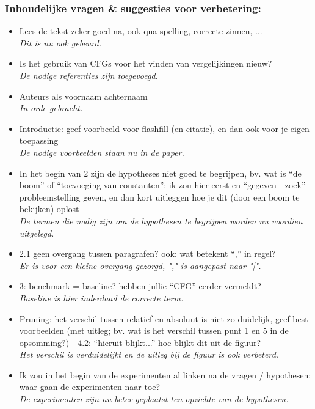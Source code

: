 \documentclass{article}
\begin{document}
\subsubsection{Inhoudelijke vragen \& suggesties voor verbetering:}
\begin{itemize}
\item Lees de tekst zeker goed na, ook qua spelling, correcte zinnen, ...
\\	\textit{Dit is nu ook gebeurd.}
\item Is het gebruik van CFGs voor het vinden van vergelijkingen nieuw?
\\	\textit{De nodige referenties zijn toegevoegd.}
\item Auteurs als voornaam achternaam
\\	\textit{In orde gebracht.}
\item Introductie: geef voorbeeld voor flashfill (en citatie), en dan ook voor je eigen toepassing
\\	\textit{De nodige voorbeelden staan nu in de paper.}
\item In het begin van 2 zijn de hypotheses niet goed te begrijpen, bv. wat is “de boom” of “toevoeging van constanten”; ik zou hier eerst en “gegeven - zoek” probleemstelling geven, en dan kort uitleggen hoe je dit (door een boom te bekijken) oplost
\\	\textit{De termen die nodig zijn om de hypothesen te begrijpen worden nu voordien uitgelegd.}
\item 2.1 geen overgang tussen paragrafen? ook: wat betekent “,” in regel?
\\	\textit{Er is voor een kleine overgang gezorgd, "," is aangepast naar "|".}
\item 3: benchmark = baseline? hebben jullie “CFG” eerder vermeldt?
\\	\textit{Baseline is hier inderdaad de correcte term.}
\item Pruning: het verschil tussen relatief en absoluut is niet zo duidelijk, geef best voorbeelden (met uitleg; bv. wat is het verschil tussen punt 1 en 5 in de opsomming?) - 4.2: “hieruit blijkt...” hoe blijkt dit uit de figuur?
\\	\textit{Het verschil is verduidelijkt en de uitleg bij de figuur is ook verbeterd.}
\item Ik zou in het begin van de experimenten al linken na de vragen / hypothesen; waar gaan de experimenten naar toe?
\\	\textit{De experimenten zijn nu beter geplaatst ten opzichte van de hypothesen.}

\end{itemize}
\end{document}
